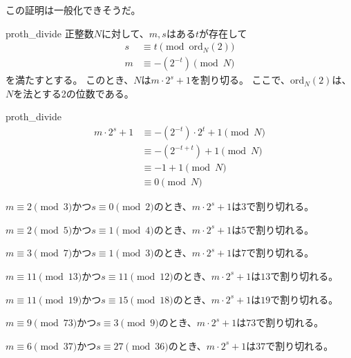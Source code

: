 この証明は一般化できそうだ。

\begin{Prop}{}{proth_divide}
正整数$N$に対して、$m,s$はある$t$が存在して
\begin{align*}
s &\equiv t \pmod{\mbox{ord}_N(2)}\\
m &\equiv -(2^{-t}) \pmod{N}
\end{align*}
を満たすとする。
このとき、$N$は$m\cdot2^s+1$を割り切る。
ここで、$\mbox{ord}_N(2)$は、$N$を法とする2の位数である。
\end{Prop}

\begin{prProof}{proth_divide}
\begin{align*}
m\cdot 2^s+1 &\equiv -(2^{-t}) \cdot 2^t + 1 \pmod{N}\\
&\equiv -(2^{-t+t}) + 1 \pmod{N}\\
&\equiv -1 + 1 \pmod{N}\\
&\equiv 0 \pmod{N}
\end{align*}
\end{prProof}

\begin{Coro}{}{}
$m\equiv2\pmod{3}$かつ$s\equiv0\pmod{2}$のとき、$m\cdot 2^s+1$は$3$で割り切れる。
\end{Coro}

\begin{Coro}{}{}
$m\equiv2\pmod{5}$かつ$s\equiv1\pmod{4}$のとき、$m\cdot 2^s+1$は$5$で割り切れる。
\end{Coro}

\begin{Coro}{}{}
$m\equiv3\pmod{7}$かつ$s\equiv1\pmod{3}$のとき、$m\cdot 2^s+1$は$7$で割り切れる。
\end{Coro}

\begin{Coro}{}{}
$m\equiv11\pmod{13}$かつ$s\equiv11\pmod{12}$のとき、$m\cdot 2^s+1$は$13$で割り切れる。
\end{Coro}

\begin{Coro}{}{}
$m\equiv11\pmod{19}$かつ$s\equiv15\pmod{18}$のとき、$m\cdot 2^s+1$は$19$で割り切れる。
\end{Coro}

\begin{Coro}{}{}
$m\equiv9\pmod{73}$かつ$s\equiv3\pmod{9}$のとき、$m\cdot 2^s+1$は$73$で割り切れる。
\end{Coro}

\begin{Coro}{}{}
$m\equiv6\pmod{37}$かつ$s\equiv27\pmod{36}$のとき、$m\cdot 2^s+1$は$37$で割り切れる。
\end{Coro}

